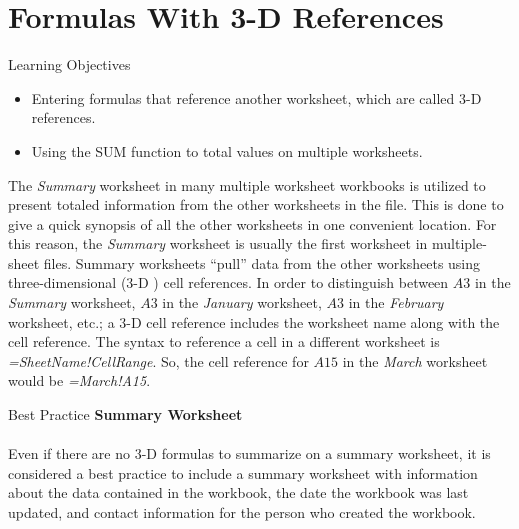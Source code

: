 \section{Formulas With 3-D References}

\begin{center}
	\begin{objbox}{Learning Objectives}
		\begin{itemize}
			\setlength{\itemsep}{0pt}
			\setlength{\parskip}{0pt}
			\setlength{\parsep}{0pt}

			\item Entering formulas that reference another worksheet, which are called $ 3 $-D references.
			\item Using the SUM function to total values on multiple worksheets.
			
		\end{itemize}
	\end{objbox}
\end{center}

The \textit{Summary} worksheet in many multiple worksheet workbooks is utilized to present totaled information from the other worksheets in the file. This is done to give a quick synopsis of all the other worksheets in one convenient location. For this reason, the \textit{Summary} worksheet is usually the first worksheet in multiple-sheet files. Summary worksheets ``pull'' data from the other worksheets using three-dimensional ($ 3 $-D ) cell references. In order to distinguish between $ A3 $ in the \textit{Summary} worksheet, $ A3 $ in the \textit{January} worksheet, $ A3 $ in the \textit{February} worksheet, etc.; a $ 3 $-D cell reference includes the worksheet name along with the cell reference. The syntax to reference a cell in a different worksheet is \textit{=SheetName!CellRange}. So, the cell reference for $ A15 $ in the \textit{March} worksheet would be \textit{=March!A15}.

\begin{center}
	\begin{infobox}{Best Practice}
		\textbf{Summary Worksheet}
		\\
		\\
		Even if there are no $ 3 $-D formulas to summarize on a summary worksheet, it is considered a best practice to include a summary worksheet with information about the data contained in the workbook, the date the workbook was last updated, and contact information for the person who created the workbook.
	\end{infobox}
\end{center}

